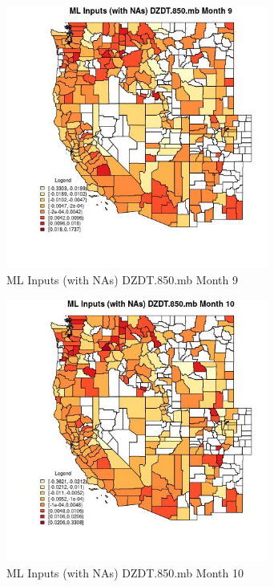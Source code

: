 \begin{figure} 
\centering  
\includegraphics[width=0.77\textwidth]{Code_Outputs/Report_ML_input_PM25_Step4_part_e_de_duplicated_aves_compiled_2019-05-21wNAs_CountyDZDT850mbmedianMonth9.jpg} 
\caption{\label{fig:Report_ML_input_PM25_Step4_part_e_de_duplicated_aves_compiled_2019-05-21wNAsCountyDZDT850mbmedianMonth9}ML Inputs (with NAs) DZDT.850.mb Month 9} 
\end{figure} 
 

\begin{figure} 
\centering  
\includegraphics[width=0.77\textwidth]{Code_Outputs/Report_ML_input_PM25_Step4_part_e_de_duplicated_aves_compiled_2019-05-21wNAs_CountyDZDT850mbmedianMonth10.jpg} 
\caption{\label{fig:Report_ML_input_PM25_Step4_part_e_de_duplicated_aves_compiled_2019-05-21wNAsCountyDZDT850mbmedianMonth10}ML Inputs (with NAs) DZDT.850.mb Month 10} 
\end{figure} 
 

